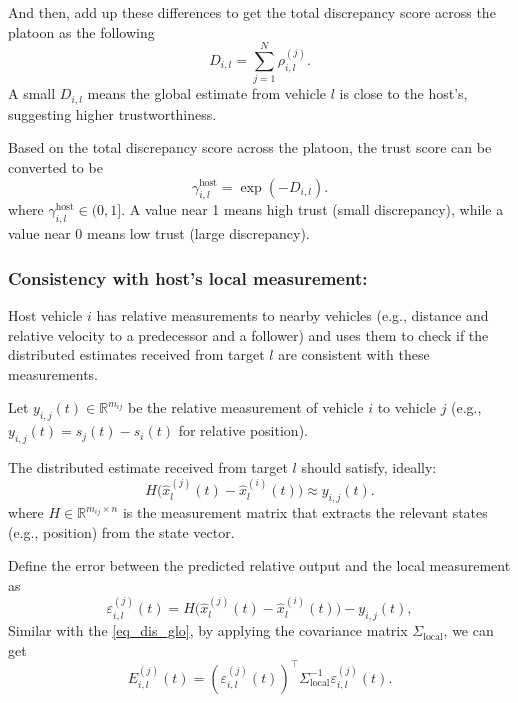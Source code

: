 And then, add up these differences to get the total discrepancy score across the platoon as the following
\begin{equation}
    D_{i,l} = \sum_{j=1}^N \rho_{i,l}^{(j)}.
\end{equation}
A small  $D_{i,l}$ means the global estimate from vehicle $l$ is close to the host's, suggesting higher trustworthiness.

Based on the total discrepancy score across the platoon, the trust score can be converted to be 
\begin{equation}
    \gamma_{i,l}^{\text{host}} = \exp\left( -{D_{i,l}} \right).
\end{equation}
where $\gamma_{i,l}^{\text{host}} \in (0, 1]$. A value near 1 means high trust (small discrepancy), while a value near 0 means low trust (large discrepancy).


\subsubsection{Consistency with host's local measurement:}
Host vehicle $i$ has relative measurements to nearby vehicles (e.g., distance and relative velocity to a predecessor and a follower) and uses them to check if the distributed estimates received from target $l$ are consistent with these measurements.

Let $y_{i,j}(t) \in \mathbb{R}^{m_{ij}}$ be the relative measurement of vehicle $i$ to vehicle $j$ (e.g., $y_{i,j}(t) = s_{j}(t) - s_{i}(t)$ for relative position).

The distributed estimate received from target $l$ should satisfy, ideally:
\begin{equation*}
    H\big(\hat{x}_l^{(j)}(t) - \hat{x}_l^{(i)}(t)\big) \approx y_{i,j}(t).
\end{equation*}
where $H \in \mathbb{R}^{m_{ij} \times n}$ is the measurement matrix that extracts the relevant states (e.g., position) from the state vector.

Define the error between the predicted relative output and the local measurement as
\begin{equation}
    \varepsilon_{i,l}^{(j)}(t) = H\big( \hat{x}_l^{(j)}(t) - \hat{x}_l^{(i)}(t) \big) - y_{i,j}(t), 
\end{equation}
Similar with the \eqref{eq_dis_glo}, by applying the covariance matrix $\Sigma_{\text{local}}$, we can get 
\begin{equation}
    E_{i,l}^{(j)}(t) = (\varepsilon_{i,l}^{(j)}(t))^{\top} \Sigma_{\text{local}}^{-1} \varepsilon_{i,l}^{(j)}(t).
\end{equation}

